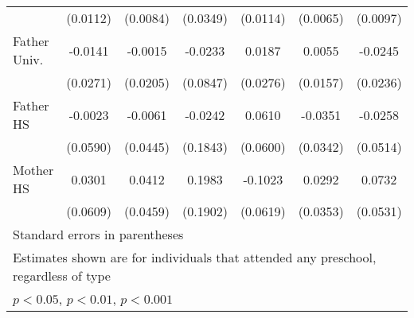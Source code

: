 \begin{table}[htbp]
\begin{tabular}{l*{6}{c}}
            &    (0.0112)         &    (0.0084)         &    (0.0349)         &    (0.0114)         &    (0.0065)         &    (0.0097)         \\
\addlinespace
Father Univ.&     -0.0141         &     -0.0015         &     -0.0233         &      0.0187         &      0.0055         &     -0.0245         \\
            &    (0.0271)         &    (0.0205)         &    (0.0847)         &    (0.0276)         &    (0.0157)         &    (0.0236)         \\
\addlinespace
Father HS   &     -0.0023         &     -0.0061         &     -0.0242         &      0.0610         &     -0.0351         &     -0.0258         \\
            &    (0.0590)         &    (0.0445)         &    (0.1843)         &    (0.0600)         &    (0.0342)         &    (0.0514)         \\
\addlinespace
Mother HS   &      0.0301         &      0.0412         &      0.1983         &     -0.1023         &      0.0292         &      0.0732         \\
            &    (0.0609)         &    (0.0459)         &    (0.1902)         &    (0.0619)         &    (0.0353)         &    (0.0531)         \\
\bottomrule
\multicolumn{7}{l}{\footnotesize Standard errors in parentheses}\\
\multicolumn{7}{l}{\footnotesize Estimates shown are for individuals that attended any preschool, regardless of type}\\
\multicolumn{7}{l}{\footnotesize \sym{*} \(p<0.05\), \sym{**} \(p<0.01\), \sym{***} \(p<0.001\)}\\
\end{tabular}
\end{table}
